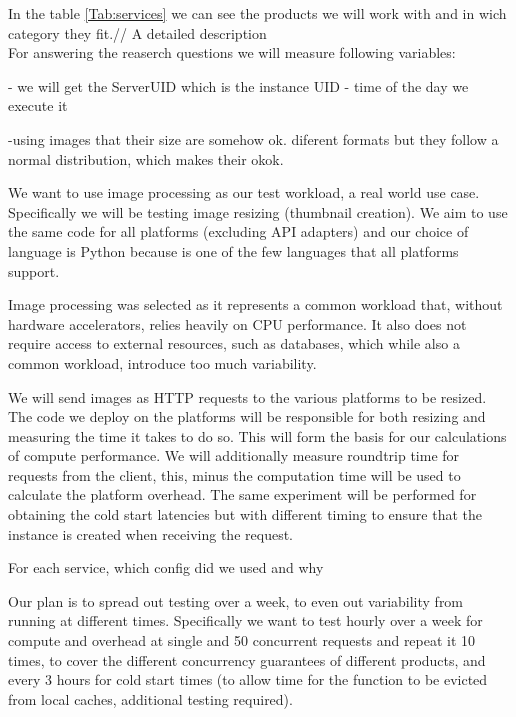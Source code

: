 \documentclass[11pt]{article}
\begin{document}
In the table \ref{Tab:services} we can see the products we will work with and in wich category they fit.// A detailed description \\



For answering the reaserch questions we will measure following variables:




- we will get the ServerUID which is the instance UID
- time of the day we execute it



-using images that their size are somehow ok. diferent formats but they follow a normal distribution, which makes their okok.

We want to use image processing as our test workload, a real world \cite{ii} use case. Specifically we will be testing image resizing (thumbnail creation). We aim to use the same code for all platforms (excluding API adapters) and our choice of language is Python because is one of the few languages that all platforms support.

Image processing was selected as it represents a common workload that, without hardware accelerators, relies heavily on CPU performance. It also does not require access to external resources, such as databases, which while also a common workload, introduce too much variability.

We will send images as HTTP requests to the various platforms to be resized. The code we deploy on the platforms will be responsible for both resizing and measuring the time it takes to do so. This will form the basis for our calculations of compute performance. We will additionally measure roundtrip time for requests from the client, this, minus the computation time will be used to calculate the platform overhead.  The same experiment will be performed for obtaining the cold start latencies but with different timing to ensure that the instance is created when receiving the request.


For each service, which config did we used and why


Our plan is to spread out testing over a week, to even out variability from running at different times. Specifically we want to test hourly over a week for compute and overhead at single and 50 concurrent requests and repeat it 10 times, to cover the different concurrency guarantees of different products, and every 3 hours for cold start times (to allow time for the function to be evicted from local caches, additional testing required).
\end{document}
